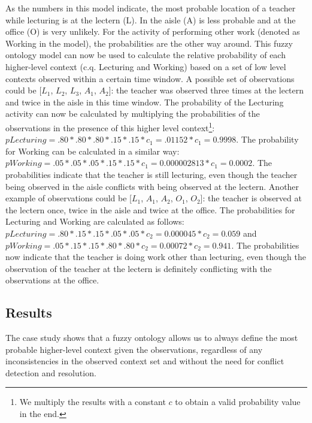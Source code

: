\documentclass[journal]{vgtc}                %
\begin{document}
As the numbers in this model indicate, the most probable location of a teacher while lecturing is at the lectern (L). In the aisle (A) is less probable and at the office (O) is very unlikely. For the activity of performing other work (denoted as Working in the model), the probabilities are the other way around. This fuzzy ontology model can now be used to calculate the relative probability of each higher-level context (c.q. Lecturing and Working) based on a set of low level contexts observed within a certain time window. A possible set of observations could be [$L_1$, $L_2$, $L_3$, $A_1$, $A_2$]: the teacher was observed three times at the lectern and twice in the aisle in this time window. The probability of the Lecturing activity can now be calculated by multiplying the probabilities of the observations in the presence of this higher level context\footnote{We multiply the results with a constant $c$ to obtain a valid probability value in the end.}: $pLecturing = .80 * .80 * .80 * .15 * .15 * c_1 = .01152 * c_1 = 0.9998$. The probability for Working can be calculated in a similar way: $pWorking = .05 * .05 * .05 * .15 * .15 * c_1 = 0.000002813 * c_1 = 0.0002$. The probabilities indicate that the teacher is still lecturing, even though the teacher being observed in the aisle conflicts with being observed at the lectern. Another example of observations could be [$L_1$, $A_1$, $A_2$, $O_1$, $O_2$]: the teacher is observed at the lectern once, twice in the aisle and twice at the office. The probabilities for Lecturing and Working are calculated as follows: $pLecturing = .80 * .15 * .15 * .05 * .05 * c_2 = 0.000045 * c_2 = 0.059$ and $pWorking = .05 * .15 * .15 * .80 * .80 * c_2 = 0.00072 * c_2 = 0.941$. The probabilities now indicate that the teacher is doing work other than lecturing, even though the observation of the teacher at the lectern is definitely conflicting with the observations at the office.
\subsection{Results}
The case study shows that a fuzzy ontology allows us to always define the most probable higher-level context given the observations, regardless of any inconsistencies in the observed context set and without the need for conflict detection and resolution.
\end{document}
